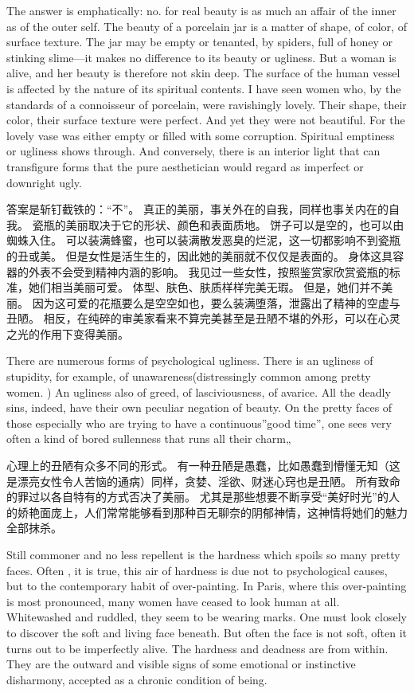 \documentclass[cs4size, a4paper, 12pt]{article}
\newcounter{numpar}
\newcommand*{\newpar}{\numpar{}}
\begin{document}
	\newpar The answer is emphatically: no. for real beauty is as much an affair of the inner as of the outer self. The beauty of a porcelain jar is a matter of shape, of color, of surface texture. The jar may be empty or tenanted, by spiders, full of honey or stinking slime—it makes no difference to its beauty or ugliness. But a woman is alive, and her beauty is therefore not skin deep. The surface of the human vessel is affected by the nature of its spiritual contents. I have seen women who, by the standards of a connoisseur of porcelain, were ravishingly lovely. Their shape, their color, their surface texture were perfect. And yet they were not beautiful. For the lovely vase was either empty or filled with some corruption. Spiritual emptiness or ugliness shows through. And conversely, there is an interior light that can transfigure forms that the pure aesthetician would regard as imperfect or downright ugly.
	
	答案是斩钉截铁的：``不''。 真正的美丽，事关外在的自我，同样也事关内在的自我。 瓷瓶的美丽取决于它的形状、颜色和表面质地。 饼子可以是空的，也可以由蜘蛛入住。 可以装满蜂蜜，也可以装满散发恶臭的烂泥，这一切都影响不到瓷瓶的丑或美。 但是女性是活生生的，因此她的美丽就不仅仅是表面的。 身体这具容器的外表不会受到精神内涵的影响。 我见过一些女性，按照鉴赏家欣赏瓷瓶的标准，她们相当美丽可爱。 体型、肤色、肤质样样完美无瑕。 但是，她们并不美丽。 因为这可爱的花瓶要么是空空如也，要么装满堕落，泄露出了精神的空虚与丑陋。 相反，在纯碎的审美家看来不算完美甚至是丑陋不堪的外形，可以在心灵之光的作用下变得美丽。 
	
	\newpar There are numerous forms of psychological ugliness. There is an ugliness of stupidity, for example, of unawareness(distressingly common among pretty women. ) An ugliness also of greed, of lasciviousness, of avarice. All the deadly sins, indeed, have their own peculiar negation of beauty. On the pretty faces of those especially who are trying to have a continuous''good time'', one sees very often a kind of bored sullenness that runs all their charm„
	
	心理上的丑陋有众多不同的形式。 有一种丑陋是愚蠢，比如愚蠢到懵懂无知（这是漂亮女性令人苦恼的通病）同样，贪婪、淫欲、财迷心窍也是丑陋。 所有致命的罪过以各自特有的方式否决了美丽。 尤其是那些想要不断享受``美好时光''的人的娇艳面庞上，人们常常能够看到那种百无聊奈的阴郁神情，这神情将她们的魅力全部抹杀。 
	
	\newpar Still commoner and no less repellent is the hardness which spoils so many pretty faces. Often , it is true, this air of hardness is due not to psychological causes, but to the contemporary habit of over-painting. In Paris, where this over-painting is most pronounced, many women have ceased to look human at all. Whitewashed and ruddled, they seem to be wearing marks. One must look closely to discover the soft and living face beneath. But often the face is not soft, often it turns out to be imperfectly alive. The hardness and deadness are from within. They are the outward and visible signs of some emotional or instinctive disharmony, accepted as a chronic condition of being.
	
\end{document}
